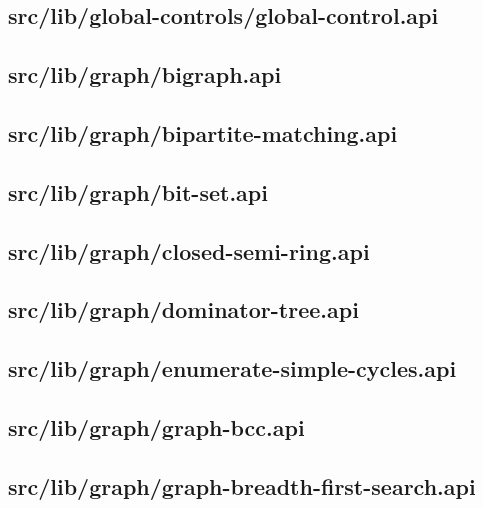 \subsection{src/lib/global-controls/global-control.api}


\subsection{src/lib/graph/bigraph.api}


\subsection{src/lib/graph/bipartite-matching.api}


\subsection{src/lib/graph/bit-set.api}


\subsection{src/lib/graph/closed-semi-ring.api}


\subsection{src/lib/graph/dominator-tree.api}


\subsection{src/lib/graph/enumerate-simple-cycles.api}


\subsection{src/lib/graph/graph-bcc.api}


\subsection{src/lib/graph/graph-breadth-first-search.api}



